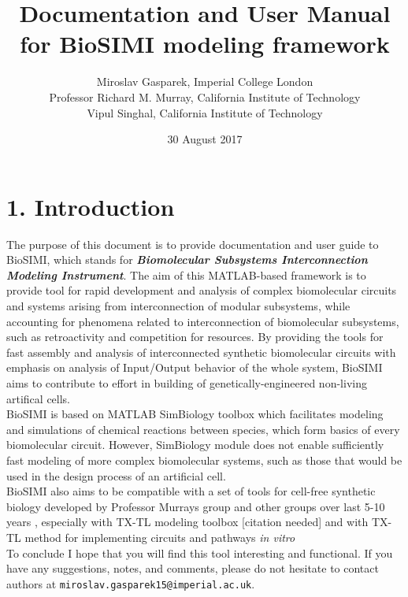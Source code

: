 \documentclass{article}
\title{\textbf{Documentation and User Manual for BioSIMI modeling framework}}
\date{30 August 2017}
\author{Miroslav Gasparek, Imperial College London \\ Professor Richard M. Murray, California Institute of Technology \\ Vipul Singhal, California Institute of Technology}
\begin{document}
\begin{titlingpage}

\end{titlingpage}
	
	\maketitle
	\newpage

	\section*{1. Introduction}
	The purpose of this document is to provide documentation and user guide to BioSIMI, which stands for \textbf{\textit{Biomolecular Subsystems Interconnection Modeling Instrument}}. The aim of this MATLAB-based framework is to provide tool for rapid development and analysis of complex biomolecular circuits and systems arising from interconnection of modular subsystems, while accounting for phenomena related to interconnection of biomolecular subsystems, such as retroactivity and competition for resources. By providing the tools for fast assembly and analysis of interconnected synthetic biomolecular circuits with emphasis on analysis of Input/Output behavior of the whole system, BioSIMI aims to contribute to effort in building of genetically-engineered non-living artifical cells. 
\\
BioSIMI is based on MATLAB SimBiology toolbox which facilitates modeling and simulations of chemical reactions between species, which form basics of every biomolecular circuit. However, SimBiology module does not enable sufficiently fast modeling of more complex biomolecular systems, such as those that would be used in the design process of an artificial cell. 
\\ BioSIMI also aims to be compatible with a set of tools for cell-free synthetic biology developed by Professor Murray\textquotesingle s group and other groups over last 5-10 years \cite{artificial}, especially with TX-TL modeling toolbox [citation needed] and with TX-TL method for implementing circuits and pathways \textit{in vitro}
\\
To conclude I hope that you will find this tool interesting and functional. If you have any suggestions, notes, and comments, please do not hesitate to contact authors at \texttt{miroslav.gasparek15@imperial.ac.uk}.
\\	
\end{document}
